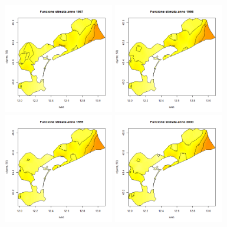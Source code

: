 \documentclass[a4paper,11pt,twoside,openright]{book}							%
\begin{document}
\begin{figure}[H]
	\centering
	\includegraphics[width=0.43\textwidth ,height=0.235\textheight]{Immagini/venezia_con_covariate/Anno1997.png}
	\includegraphics[width=0.43\textwidth ,height=0.235\textheight]{Immagini/venezia_con_covariate/Anno1998.png}
	\includegraphics[width=0.43\textwidth ,height=0.235\textheight]{Immagini/venezia_con_covariate/Anno1999.png}
	\includegraphics[width=0.43\textwidth ,height=0.235\textheight]{Immagini/venezia_con_covariate/Anno2000.png}

\end{figure}
\end{document}
